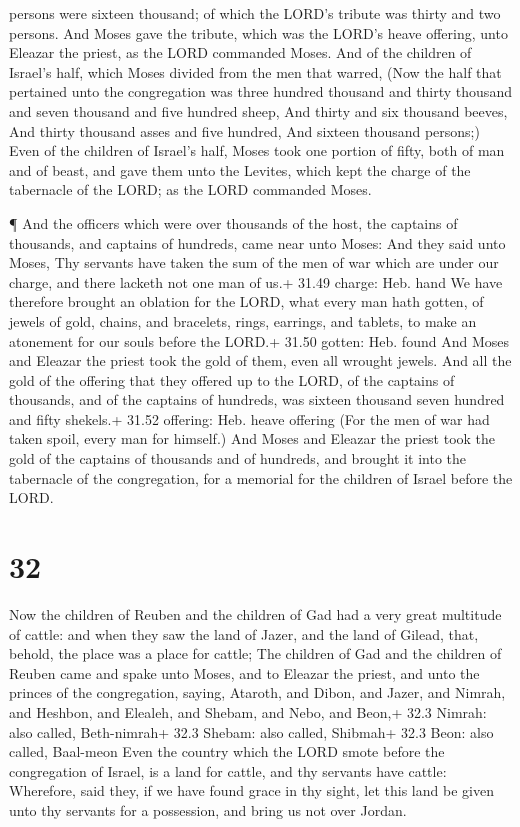 persons were sixteen thousand; of which the LORD's tribute was thirty
and two persons.  And Moses gave the tribute, which was the
LORD's heave offering, unto Eleazar the priest, as the LORD commanded
Moses.  And of the children of Israel's half, which Moses
divided from the men that warred,  (Now the half that
pertained unto the congregation was three hundred thousand and thirty
thousand and seven thousand and five hundred sheep,  And
thirty and six thousand beeves,  And thirty thousand asses
and five hundred,  And sixteen thousand persons;)
 Even of the children of Israel's half, Moses took one
portion of fifty, both of man and of beast, and gave them unto the
Levites, which kept the charge of the tabernacle of the LORD; as the
LORD commanded Moses.

 ¶ And the officers which were over thousands of the host,
the captains of thousands, and captains of hundreds, came near unto
Moses:  And they said unto Moses, Thy servants have taken
the sum of the men of war which are under our charge, and there lacketh
not one man of us.+ 31.49 charge: Heb. hand  We have
therefore brought an oblation for the LORD, what every man hath gotten,
of jewels of gold, chains, and bracelets, rings, earrings, and tablets,
to make an atonement for our souls before the LORD.+ 31.50 gotten: Heb.
found  And Moses and Eleazar the priest took the gold of
them, even all wrought jewels.  And all the gold of the
offering that they offered up to the LORD, of the captains of thousands,
and of the captains of hundreds, was sixteen thousand seven hundred and
fifty shekels.+ 31.52 offering: Heb. heave offering  (For
the men of war had taken spoil, every man for himself.) 
And Moses and Eleazar the priest took the gold of the captains of
thousands and of hundreds, and brought it into the tabernacle of the
congregation, for a memorial for the children of Israel before the LORD.

\hypertarget{section-31}{%
\section{32}\label{section-31}}

 Now the children of Reuben and the children of Gad had a
very great multitude of cattle: and when they saw the land of Jazer, and
the land of Gilead, that, behold, the place was a place for cattle;
 The children of Gad and the children of Reuben came and
spake unto Moses, and to Eleazar the priest, and unto the princes of the
congregation, saying,  Ataroth, and Dibon, and Jazer, and
Nimrah, and Heshbon, and Elealeh, and Shebam, and Nebo, and Beon,+ 32.3
Nimrah: also called, Beth-nimrah+ 32.3 Shebam: also called, Shibmah+
32.3 Beon: also called, Baal-meon  Even the country which
the LORD smote before the congregation of Israel, is a land for cattle,
and thy servants have cattle:  Wherefore, said they, if we
have found grace in thy sight, let this land be given unto thy servants
for a possession, and bring us not over Jordan.

